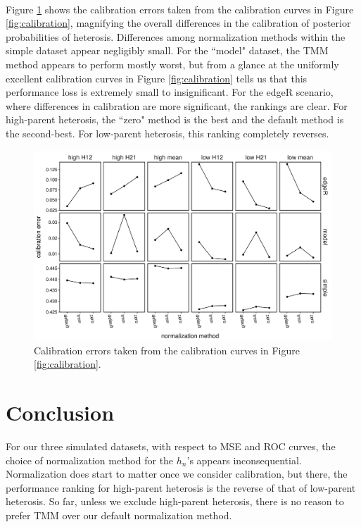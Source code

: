 \documentclass{article}
\begin{document}
\begin{flushleft}
\paragraph{} Figure \ref{fig:calibrationerror} shows the calibration errors taken from the calibration curves in Figure \ref{fig:calibration}, magnifying the overall differences in the calibration of posterior probabilities of heterosis. Differences among normalization methods within the simple dataset appear negligibly small. For the ``model" dataset, the TMM method appears to perform mostly worst, but from a glance at the uniformly excellent calibration curves in Figure \ref{fig:calibration} tells us that this performance loss is extremely small to insignificant. For the edgeR scenario, where differences in calibration are more significant, the rankings are clear. For high-parent heterosis, the ``zero" method is the best and the default method is the second-best. For low-parent heterosis, this ranking completely reverses. 

\begin{figure}[htbp]
   \centering
   \includegraphics[scale=0.5]{calibration_error}
   \caption{Calibration errors taken from the calibration curves in Figure \ref{fig:calibration}.}
   \label{fig:calibrationerror}
\end{figure}

\section{Conclusion}

For our three simulated datasets, with respect to MSE and ROC curves, the choice of normalization method for the $h_n$'s appears inconsequential. Normalization does start to matter once we consider calibration, but there, the performance ranking for high-parent heterosis is the reverse of that of low-parent heterosis. So far, unless we exclude high-parent heterosis, there is no reason to prefer TMM over our default normalization method.

\end{flushleft}


\end{document}
